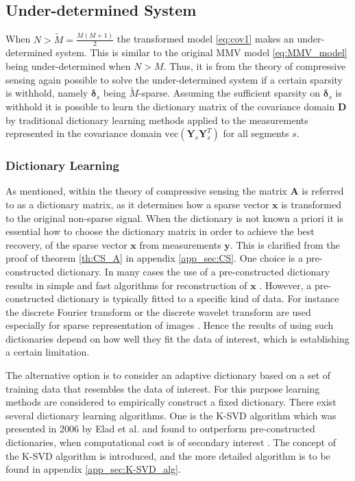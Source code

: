 \subsection{Under-determined System}\label{sec:cov1}
When $N > \widetilde{M} = \frac{M(M+1)}{2}$ the transformed model \eqref{eq:cov1} makes an under-determined system.   
This is similar to the original MMV model \eqref{eq:MMV_model} being under-determined  when $N > M$. 
Thus, it is from the theory of compressive sensing again possible to solve the under-determined system if a certain sparsity is withhold, namely $\boldsymbol{\delta}_s$ being $\widetilde{M}$-sparse.
Assuming the sufficient sparsity on $\boldsymbol{\delta}_s$ is withhold it is possible to learn the dictionary matrix of the covariance domain $\mathbf{D}$ by traditional dictionary learning methods applied to the measurements represented in the covariance domain $\text{vec}\left( \mathbf{Y}_s \mathbf{Y}_s^T \right)$ for all segments $s$.

\subsubsection{Dictionary Learning}\label{sec:dictionarylearning}
As mentioned, within the theory of compressive sensing the matrix $\mathbf{A}$ is referred to as a dictionary matrix, as it determines how a sparse vector $\mathbf{x}$ is transformed to the original non-sparse signal. 
When the dictionary is not known a priori it is essential how to choose the dictionary matrix in order to achieve the best recovery, of the sparse vector $\mathbf{x}$ from measurements $\mathbf{y}$. 
This is clarified from the proof of theorem \ref{th:CS_A} in appendix \ref{app_sec:CS}. 
One choice is a pre-constructed dictionary. 
In many cases the use of a pre-constructed dictionary results in simple and fast algorithms for reconstruction of $\mathbf{x}$ \cite{Elad_book}. 
However, a pre-constructed dictionary is typically fitted to a specific kind of data. 
For instance the discrete Fourier transform or the discrete wavelet transform are used especially for sparse representation of images \cite{Elad_book}. 
Hence the results of using such dictionaries depend on how well they fit the data of interest, which is establishing a certain limitation. 

The alternative option is to consider an adaptive dictionary based on a set of training data that resembles the data of interest. 
For this purpose learning methods are considered to empirically construct a fixed dictionary. 
There exist several dictionary learning algorithms. One is the K-SVD algorithm which was presented in 2006 by Elad et al. and found to outperform pre-constructed dictionaries, when computational cost is of secondary interest \cite{Elad2006}. 
The concept of the K-SVD algorithm is introduced, and the more detailed algorithm is to be found in appendix \ref{app_sec:K-SVD_alg}. 

